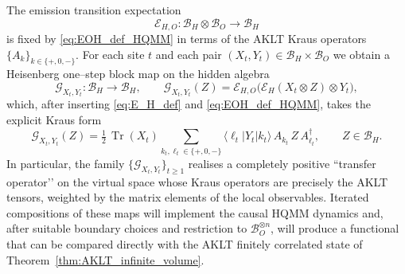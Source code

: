 \documentclass[11pt,a4paper]{article}
\begin{document}
The emission transition expectation
\[
\mathcal{E}_{H,O}:\mathcal{B}_H\otimes\mathcal{B}_O\to\mathcal{B}_H
\]
is fixed by \eqref{eq:EOH_def_HQMM} in terms of the AKLT Kraus operators $\{A_k\}_{k\in\{+,0,-\}}$. For each site $t$ and each pair $(X_t,Y_t)\in\mathcal{B}_H\times\mathcal{B}_O$ we obtain a Heisenberg one–step block map on the hidden algebra
\begin{equation}\label{eq:G_block_def-prep}
\mathcal{G}_{X_t,Y_t}:\mathcal{B}_H\to\mathcal{B}_H,
\qquad
\mathcal{G}_{X_t,Y_t}(Z)
=
\mathcal{E}_{H,O}\bigl(\mathcal{E}_H(X_t\otimes Z)\otimes Y_t\bigr),
\end{equation}
which, after inserting \eqref{eq:E_H_def} and \eqref{eq:EOH_def_HQMM}, takes the explicit Kraus form
\begin{equation}\label{eq:G_single_step_def-prep}
\mathcal{G}_{X_t,Y_t}(Z)
=
\tfrac{1}{2}\,\operatorname{Tr}(X_t)
\sum_{k_t,\ell_t\in\{+,0,-\}}
\langle \ell_t|Y_t|k_t\rangle\,
A_{k_t}\,Z\,A_{\ell_t}^{\dagger},
\qquad Z\in\mathcal{B}_H.
\end{equation}
In particular, the family $\{\mathcal{G}_{X_t,Y_t}\}_{t\ge 1}$ realises a completely positive “transfer operator’’ on the virtual space whose Kraus operators are precisely the AKLT tensors, weighted by the matrix elements of the local observables. Iterated compositions of these maps will implement the causal HQMM dynamics and, after suitable boundary choices and restriction to $\mathcal{B}_O^{\otimes n}$, will produce a functional that can be compared directly with the AKLT finitely correlated state of Theorem~\ref{thm:AKLT_infinite_volume}.
\end{document}
